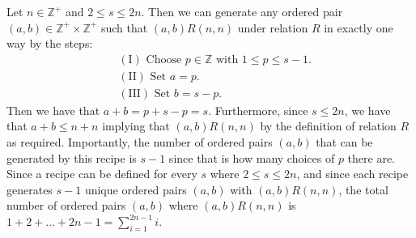\documentclass[11pt, letterpaper]{article}
\begin{document}
\begin{recipe}
    Let $n\in\mathbb{Z^+}$ and $2\leq s\leq 2n$. Then we can generate any ordered pair $(a,b)\in\mathbb{Z^+}\times\mathbb{Z^+}$ such that $(a,b)R(n,n)$ under relation $R$ in exactly one way by the steps:
    \begin{align*}
        &(\text{I})\text{ Choose $p\in\mathbb{Z}$ with $1\leq p\leq s-1$.}\\
        &(\text{II})\text{ Set $a=p$.}\\
        &(\text{III})\text{ Set $b=s-p$.}
    \end{align*} 
    Then we have that $a+b=p+s-p=s$. Furthermore, since $s\leq 2n$, we have that $a+b\leq n+n$ implying that $(a,b)R(n,n)$ by the definition of relation $R$ as required.
    Importantly, the number of ordered pairs $(a,b)$ that can be generated by this recipe is $s-1$ since that is how many choices of $p$ there are. 
    Since a recipe can be defined for every $s$ where $2\leq s\leq 2n$, and since each recipe generates $s-1$ unique ordered pairs $(a,b)$ with $(a,b)R(n,n)$, the total number of ordered pairs $(a,b)$ where $(a,b)R(n,n)$ is $1+2+...+2n-1=\sum_{i=1}^{2n-1}i$.
\end{recipe}
\end{document}

